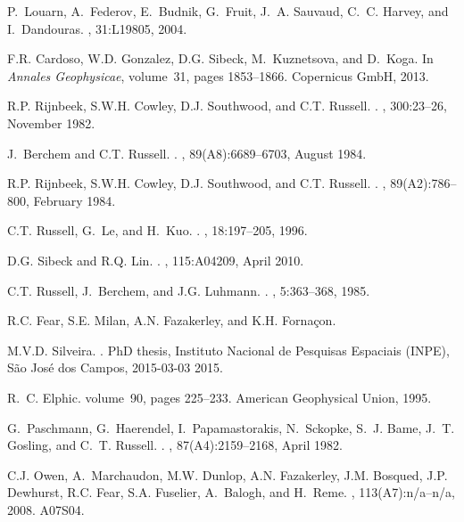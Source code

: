 \begin{thebibliography}{10}
	P.~Louarn, A.~Federov, E.~Budnik, G.~Fruit, J.~A. Sauvaud, C.~C. Harvey, and
	I.~Dandouras.
	, 31:L19805, 2004.
	
	F.R. Cardoso, W.D. Gonzalez, D.G. Sibeck, M.~Kuznetsova, and D.~Koga.
	\newblock In {\em Annales Geophysicae}, volume~31, pages 1853--1866. Copernicus
	GmbH, 2013.
	
	R.P. Rijnbeek, S.W.H. Cowley, D.J. Southwood, and C.T. Russell.
	\newblock {}.
	, 300:23--26, November 1982.
	
	J.~Berchem and C.T. Russell.
	\newblock {}.
	, 89(A8):6689--6703, August
	1984.
	
	R.P. Rijnbeek, S.W.H. Cowley, D.J. Southwood, and C.T. Russell.
	\newblock {}.
	, 89(A2):786--800, February
	1984.
	
	C.T. Russell, G.~Le, and H.~Kuo.
	\newblock {}.
	, 18:197--205, 1996.
	
	D.G. Sibeck and R.Q. Lin.
	\newblock {}.
	, 115:A04209, April 2010.
	
	C.T. Russell, J.~Berchem, and J.G. Luhmann.
	\newblock {}.
	, 5:363--368, 1985.
	
	R.C. Fear, S.E. Milan, A.N. Fazakerley, and K.H. Forna{\c c}on.
	
	M.V.D. Silveira.
	.
	\newblock PhD thesis, Instituto Nacional de Pesquisas Espaciais (INPE), S{\~a}o
	Jos{\'e} dos Campos, 2015-03-03 2015.
	
	R.~C. Elphic.
	\newblock volume~90, pages 225--233.
	\newblock American Geophysical Union, 1995.
	
	G.~Paschmann, G.~Haerendel, I.~Papamastorakis, N.~Sckopke, S.~J. Bame, J.~T.
	Gosling, and C.~T. Russell.
	\newblock {}.
	, 87(A4):2159--2168, April 1982.
	
	C.J. Owen, A.~Marchaudon, M.W. Dunlop, A.N. Fazakerley, J.M. Bosqued, J.P.
	Dewhurst, R.C. Fear, S.A. Fuselier, A.~Balogh, and H.~Reme.
	, 113(A7):n/a--n/a, 2008.
	\newblock A07S04.
	

\end{thebibliography}
